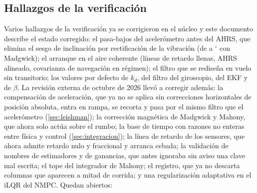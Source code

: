 \subsection{Hallazgos de la verificación}

Varios hallazgos de la verificación ya se corrigieron en el núcleo y este
documento describe el estado corregido: el pasa-bajos del acelerómetro antes
del AHRS, que elimina el sesgo de inclinación por rectificación de la
vibración (de  a $^\circ$ con Madgwick); el
arranque en el aire coherente (líneas de retardo llenas, AHRS alineado,
covarianza de navegación en régimen); el filtro que se rediseña en vuelo
sin transitorio; los valores por defecto de $k_d$, del filtro del
giroscopio, del EKF y de $\beta$. La revisión externa de octubre de 2026
llevó a corregir además: la compensación de aceleración, que ya no se aplica
sin correcciones horizontales de posición absoluta, entra en rampa, se
recorta y pasa por el mismo filtro que el acelerómetro
(\cref{sec:leishman}); la corrección magnética de Madgwick y Mahony, que
ahora solo actúa sobre el rumbo; la base de tiempo con razones no enteras
entre física y control (\cref{sec:integracion}); la línea de retardo de los
sensores, que ahora admite retardo nulo y fraccional y arranca cebada; la
validación de nombres de estimadores y de ganancias, que antes ignoraba sin
aviso una clave mal escrita; el tope del integrador de Mahony; el registro,
que ya no descarta columnas que aparecen a mitad de corrida; y una
regularización adaptativa en el iLQR del NMPC. Quedan abiertos:

